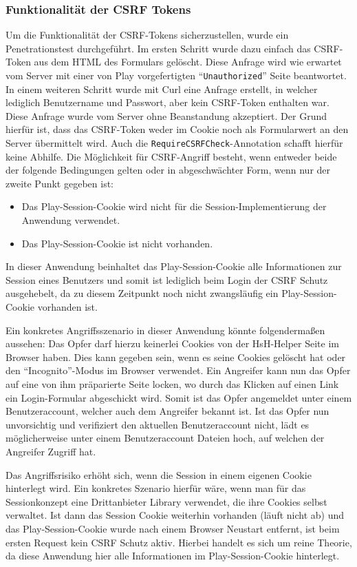 \documentclass[12pt,DIV14,BCOR10mm,a4paper,parskip=half-,headsepline,headinclude,english,ngerman,bibliography=totocnumbered]{scrreprt}
\begin{document}
\subsubsection{Funktionalität der CSRF Tokens}
Um die Funktionalität der CSRF-Tokens sicherzustellen, wurde ein Penetrationstest durchgeführt. Im ersten Schritt wurde dazu einfach das CSRF-Token aus dem HTML des Formulars gelöscht. Diese Anfrage wird wie erwartet vom Server mit einer von Play vorgefertigten \enquote{\texttt{Unauthorized}} Seite beantwortet. In einem weiteren Schritt wurde mit Curl eine Anfrage erstellt, in welcher lediglich Benutzername und Passwort, aber kein CSRF-Token enthalten war. Diese Anfrage wurde vom Server ohne Beanstandung akzeptiert. Der Grund hierfür ist, dass das CSRF-Token weder im Cookie noch als Formularwert an den Server übermittelt wird. Auch die \texttt{RequireCSRFCheck}-Annotation schafft hierfür keine Abhilfe. Die Möglichkeit für CSRF-Angriff besteht, wenn entweder beide der folgende Bedingungen gelten oder in abgeschwächter Form, wenn nur der zweite Punkt gegeben ist:

  \begin{itemize}
    \item Das Play-Session-Cookie wird nicht für die Session-Implementierung der Anwendung verwendet.
    \item Das Play-Session-Cookie ist nicht vorhanden.
  \end{itemize}

In dieser Anwendung beinhaltet das Play-Session-Cookie alle Informationen zur Session eines Benutzers und somit ist lediglich beim Login der CSRF Schutz ausgehebelt, da zu diesem Zeitpunkt noch nicht zwangsläufig ein Play-Session-Cookie vorhanden ist.

Ein konkretes Angriffsszenario in dieser Anwendung könnte folgendermaßen aussehen: Das Opfer darf hierzu keinerlei Cookies von der HsH-Helper Seite im Browser haben. Dies kann gegeben sein, wenn es seine Cookies gelöscht hat oder den \enquote{Incognito}-Modus im Browser verwendet. Ein Angreifer kann nun das Opfer auf eine von ihm präparierte Seite locken, wo durch das Klicken auf einen Link ein Login-Formular abgeschickt wird. Somit ist das Opfer angemeldet unter einem Benutzeraccount, welcher auch dem Angreifer bekannt ist. Ist das Opfer nun unvorsichtig und verifiziert den aktuellen Benutzeraccount nicht, lädt es möglicherweise unter einem Benutzeraccount Dateien hoch, auf welchen der Angreifer Zugriff hat.

Das Angriffsrisiko erhöht sich, wenn die Session in einem eigenen Cookie hinterlegt wird. Ein konkretes Szenario hierfür wäre, wenn man für das Sessionkonzept eine Drittanbieter Library verwendet, die ihre Cookies selbst verwaltet. Ist dann das Session Cookie weiterhin vorhanden (läuft nicht ab) und das Play-Session-Cookie wurde nach einem Browser Neustart entfernt, ist beim ersten Request kein CSRF Schutz aktiv. Hierbei handelt es sich um reine Theorie, da diese Anwendung hier alle Informationen im Play-Session-Cookie hinterlegt.
\end{document}
